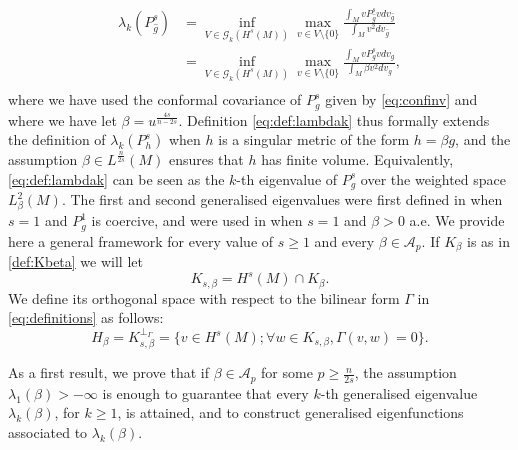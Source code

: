 \documentclass[10pt]{amsart}
\numberwithin{equation}{section}
\theoremstyle{plain}
\theoremstyle{remark}
\begin{document}
 $$\begin{aligned} 
  \lambda_k(P_{\hat{g}}^s) & =  \inf_{V \in \mathcal{G}_k(H^s(M))} \max_{v\in V\setminus \{0\}} \frac{\int_M v P_{\hat{g}}^s v dv_{\hat{g}} }{\int_M v^2 dv_{\hat{g}}}  \\
  & =  \inf_{V \in \mathcal{G}_k(H^s(M))} \max_{v\in V\setminus \{0\}} \frac{\int_M v P_{g}^s v dv_{g} }{\int_M \beta v^2 dv_{g}}, \\
  \end{aligned} $$ 
 where we have used the conformal covariance of $P_g^s$ given by \eqref{eq:confinv} and where we have let $\beta = u ^{\frac{4s}{n-2s}}$. Definition \eqref{eq:def:lambdak} thus formally extends the definition of $\lambda_k(P_h^s)$ when $h$ is a singular metric of the form $h = \beta g$, and the assumption $\beta \in L^{\frac{n}{2s}}(M)$ ensures that $h$ has finite volume.  Equivalently, \eqref{eq:def:lambdak} can be seen as the $k$-th eigenvalue of $P_g^s$ over the weighted space $L^2_\beta(M)$. The first and second generalised eigenvalues were first defined in \cite{AmmannHumbert} when $s=1$ and $P_g^1$ is coercive, and were used in \cite{GurskyPerez} when $s=1$ and $\beta > 0 $ a.e. We provide here a general framework for every value of $s \ge1$ and every $\beta \in \mathcal{A}_p$. If $K_\beta$ is as in \eqref{def:Kbeta} we will let 
$$ K_{s, \beta} = H^s(M) \cap K_\beta.$$
We define its orthogonal space with respect to the bilinear form $\Gamma$ in \eqref{eq:definitions} as follows:
$$ H_{\beta} = K_{s,\beta}^{\perp_{\Gamma}} = \{ v \in H^s(M) ; \forall w \in K_{s,\beta}, \Gamma(v,w) = 0 \} .$$


\medskip 

As a first result, we prove that if $\beta \in \mathcal{A}_p$ for some $p\geq \frac{n}{2s}$, the assumption $\lambda_1(\beta) > -\infty$ is enough to guarantee that every  $k$-th generalised eigenvalue $\lambda_k(\beta)$, for $k \ge 1$, is attained, and to construct generalised eigenfunctions associated to $\lambda_k(\beta)$. 
\end{document}
